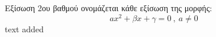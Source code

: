 Εξίσωση 2ου βαθμού ονομάζεται κάθε εξίσωση της μορφής:
\[ ax^2+\beta x+\gamma=0\ ,\ a\neq 0 \]
text added
